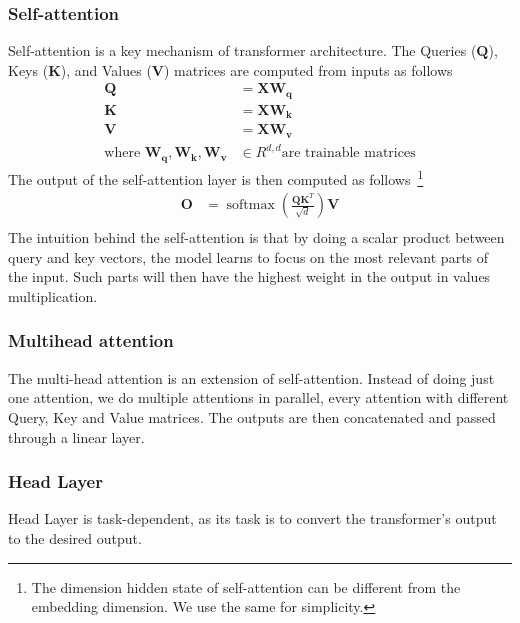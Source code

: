 \subsubsection{Self-attention}
Self-attention is a key mechanism of transformer architecture.
The Queries ($\mathbf{Q}$), Keys ($\mathbf{K}$), and Values ($\mathbf{V}$) matrices are computed from inputs as follows
\begin{align}
    \mathbf{Q}                                             & = \mathbf{X} \mathbf{W_q}                  \\
    \mathbf{K}                                             & = \mathbf{X} \mathbf{W_k}                  \\
    \mathbf{V}                                             & = \mathbf{X} \mathbf{W_v}                  \\
    \text{where } \mathbf{W_q}, \mathbf{W_k}, \mathbf{W_v} & \in R^{d, d} \text{are trainable matrices}
\end{align}
The output of the self-attention layer is then computed as follows~\footnote{The dimension hidden state of self-attention can be different from the embedding dimension. We use the same for simplicity.}
\begin{align}
    \mathbf{O} & = \operatorname{softmax}\left(\frac{\mathbf{Q} \mathbf{K}^T}{\sqrt{d}}\right) \mathbf{V} \\
    \label{eq:attention}
\end{align}
The intuition behind the self-attention is that by doing a scalar product between query and key vectors,
the model learns to focus on the most relevant parts of the input.
Such parts will then have the highest weight in the output in values multiplication.

\subsubsection{Multihead attention}
The multi-head attention is an extension of self-attention.
Instead of doing just one attention, we do multiple attentions in parallel, every attention with different Query, Key and Value matrices.
The outputs are then concatenated and passed through a linear layer.

\subsubsection{Head Layer}
Head Layer is task-dependent, as its task is to convert the transformer's output to the desired output.

